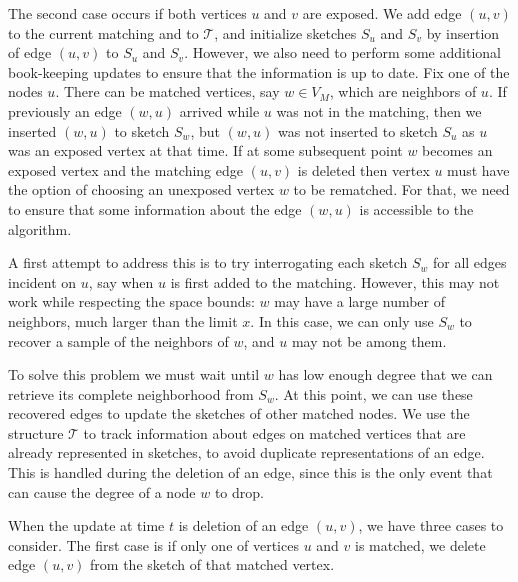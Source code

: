 \documentclass[11pt,letter]{article}
\renewcommand{\paragraph}[1]{\medskip \noindent {\bf #1}}
\begin{document}
The second case occurs if both vertices $u$ and $v$ are exposed.
We add edge $(u,v)$ to the current matching and to $\mathcal{T}$, and initialize sketches $S_u$
and $S_v$ by insertion of edge $(u,v)$ to $S_u$ and $S_v$.
However, we also need to perform some additional book-keeping updates
to ensure that the information is up to date.
Fix one of the nodes $u$.
There can be matched vertices, say $w\in V_M$, which are neighbors of $u$.
If previously an edge $(w, u)$ arrived while $u$ was not in the
matching, then 
we inserted $(w,u)$ to
sketch $S_w$, but $(w,u)$ was not inserted to sketch $S_u$
as $u$ was an exposed vertex at that time.
If at some subsequent point $w$ becomes an exposed vertex
and the matching edge $(u,v)$ is deleted
then vertex $u$ must have the option of
choosing an unexposed vertex $w$ to be rematched.
For that, we need to ensure that some information about the edge
$(w,u)$ is accessible to the algorithm.




A first attempt to address this is to try interrogating each sketch
$S_w$ for all edges incident on $u$, say when $u$ is first added to
the matching.
However, this may not work while respecting the space bounds:
$w$ may have a large number of neighbors, much larger than the limit
$x$.
In this case, we can only use $S_w$ to recover a sample of the
neighbors of $w$, and $u$ may not be among them.


To solve this problem we must wait until $w$
has low enough degree that we can retrieve its complete neighborhood
from $S_w$.
At this point, we can use these recovered edges to update the sketches
of other matched nodes.
We use the structure $\mathcal{T}$ to track information about edges
on matched vertices that are already represented in sketches, to avoid
duplicate representations of an edge.
This is handled during the deletion of an edge, since this is the only
event that can cause the degree of a node $w$ to drop.






\paragraph{Deletion of an Edge $(u,v)$ at Time $t$.}
When
the update at time $t$ is deletion of an edge $(u,v)$,
we have three cases to consider.
The first case is if only one of vertices $u$ and $v$ is matched, we
delete edge $(u,v)$ from the sketch of that matched vertex.
\end{document}
